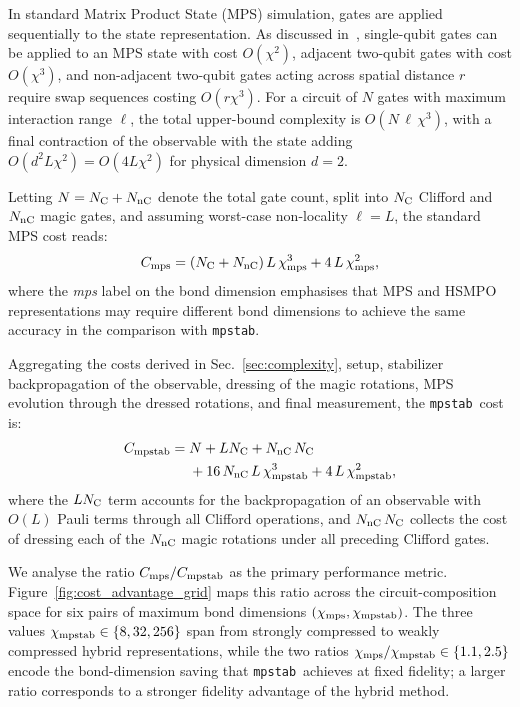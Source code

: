 \documentclass[pra,aps,twocolumn,longbibliography,preprintnumbers,superscriptaddress,nofootnotebib,10pt]{revtex4-2}
\newcommand{\numqubits}{L}  %
\newcommand{\maxintlen}{{\ell}} %
\newcommand{\numgates}{N}   %
\newcommand{\numcliff}{{N_{\rm C}}} %
\newcommand{\nummagic}{{N_{\rm nC}}} %
\newcommand{\mpstab}{\texttt{mpstab}}
\begin{document}
In standard Matrix Product State (MPS) simulation, gates are applied 
sequentially to the state representation. As discussed 
in~\cite{jozsa2006simulationquantumcircuits}, single-qubit gates can be 
applied to an MPS state with cost $O(\chi^2)$, adjacent two-qubit gates with 
cost $O(\chi^3)$, and non-adjacent two-qubit gates acting across spatial 
distance $r$ require swap sequences costing $O(r\chi^3)$. For a circuit of 
$\numgates$ gates with maximum interaction range $\maxintlen$, the total 
upper-bound complexity is $O(\numgates\,\maxintlen\,\chi^3)$, with a final 
contraction of the observable with the state adding 
$O(d^2\numqubits\chi^2) = O(4\numqubits\chi^2)$ for physical dimension $d=2$.

Letting $\numgates = \numcliff + \nummagic$ denote the total gate count, 
split into $\numcliff$ Clifford and $\nummagic$ magic gates, and assuming 
worst-case non-locality $\maxintlen = \numqubits$, the standard MPS cost 
reads:
\begin{equation}
    C_{\rm mps} = (\numcliff + \nummagic) \, \numqubits \, \chi_{\rm mps}^3 
                + 4 \, \numqubits \, \chi_{\rm mps}^2,
\end{equation}
where the \textit{mps} label on the bond dimension emphasises that MPS and 
HSMPO representations may require different bond dimensions to achieve the 
same accuracy in the comparison with \mpstab.

Aggregating the costs derived in Sec.~\ref{sec:complexity}, setup, 
stabilizer backpropagation of the observable, dressing of the magic 
rotations, MPS evolution through the dressed rotations, and final 
measurement, the \mpstab\ cost is:
\begin{equation}
\begin{split}
C_{\rm mpstab} = {} & \numgates + \numqubits \numcliff + \nummagic \, \numcliff \\
                    & + 16 \, \nummagic \, \numqubits \, \chi_{\rm mpstab}^3 
                    + 4 \, \numqubits \, \chi_{\rm mpstab}^2,
\end{split}
\end{equation}
where the $\numqubits \numcliff$ term accounts for the backpropagation of an 
observable with $O(\numqubits)$ Pauli terms through all Clifford operations, 
and $\nummagic \, \numcliff$ collects the cost of dressing each of the 
$\nummagic$ magic rotations under all preceding Clifford gates.

We analyse the ratio $C_{\rm mps}/C_{\rm mpstab}$ as the primary performance 
metric. Figure~\ref{fig:cost_advantage_grid} maps this ratio across the 
circuit-composition space for six pairs of maximum bond dimensions 
$(\chi_{\rm mps}, \chi_{\rm mpstab})$. The three values 
$\chi_{\rm mpstab} \in \{8, 32, 256\}$ span from strongly compressed to 
weakly compressed hybrid representations, while the two ratios 
$\chi_{\rm mps}/\chi_{\rm mpstab} \in \{1.1, 2.5\}$ encode the 
bond-dimension saving that \mpstab\ achieves at fixed fidelity; a larger ratio corresponds to a 
stronger fidelity advantage of the hybrid method.
\end{document}
